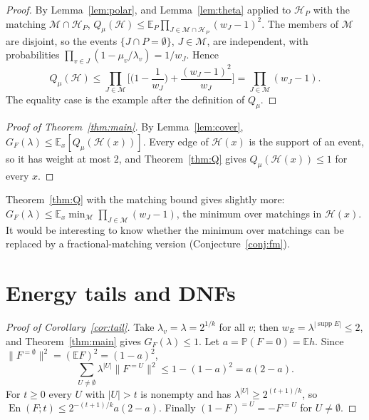 \documentclass[11pt,reqno]{amsart}
\theoremstyle{definition}
\newcommand{\E}{\mathbb E}
\newcommand{\PP}{\mathbb P}
\newcommand{\supp}{\operatorname{supp}}
\newcommand{\energy}{\operatorname{En}}
\newcommand{\Ho}{\mathcal H}
\newcommand{\cM}{\mathcal M}
\begin{document}
\begin{proof}
By Lemma~\ref{lem:polar}, and Lemma~\ref{lem:theta} applied to $\Ho_P$ with
the matching $\cM\cap\Ho_P$,
$Q_\mu(\Ho)\le\E_P\prod_{J\in\cM\cap\Ho_P}(w_J-1)^2$.  The members of $\cM$ are disjoint,
so the events $\{J\cap P=\emptyset\}$, $J\in\cM$, are independent, with probabilities
$\prod_{v\in J}(1-\mu_v/\lambda_v)=1/w_J$.  Hence
\[
 Q_\mu(\Ho)\le\prod_{J\in\cM}\Big[\Big(1-\frac1{w_J}\Big)+\frac{(w_J-1)^2}{w_J}\Big]=\prod_{J\in\cM}(w_J-1).
\]
The equality case is the example after the definition of $Q_\mu$.
\end{proof}

\begin{proof}[Proof of Theorem~\ref{thm:main}]
By Lemma~\ref{lem:cover}, $G_F(\lambda)\le\E_x[Q_\mu(\Ho(x))]$.  Every edge of $\Ho(x)$
is the support of an event, so it has weight at most $2$, and
Theorem~\ref{thm:Q} gives $Q_\mu(\Ho(x))\le1$ for every $x$.
\end{proof}

Theorem~\ref{thm:Q} with the matching bound gives slightly more:
$G_F(\lambda)\le\E_x\min_{\cM}\prod_{J\in\cM}(w_J-1)$, the minimum over matchings in $\Ho(x)$.
It would be interesting to know whether the minimum over matchings can be
replaced by a fractional-matching version (Conjecture~\ref{conj:fm}).

\section{Energy tails and DNFs}\label{sec:dnf}

\begin{proof}[Proof of Corollary~\ref{cor:tail}]
Take $\lambda_v=\lambda=2^{1/k}$ for all $v$; then $w_E=\lambda^{|\supp E|}\le2$, and
Theorem~\ref{thm:main} gives $G_F(\lambda)\le1$.  Let $a=\PP(F=0)=\E h$.  Since
$\|F^{=\emptyset}\|^2=(\E F)^2=(1-a)^2$,
\[
 \sum_{U\ne\emptyset}\lambda^{|U|}\|F^{=U}\|^2\le1-(1-a)^2=a(2-a).
\]
For $t\ge0$ every $U$ with $|U|>t$ is nonempty and has $\lambda^{|U|}\ge2^{(t+1)/k}$, so
$\energy(F;t)\le2^{-(t+1)/k}a(2-a)$.  Finally $(1-F)^{=U}=-F^{=U}$ for $U\ne\emptyset$.
\end{proof}
\end{document}

